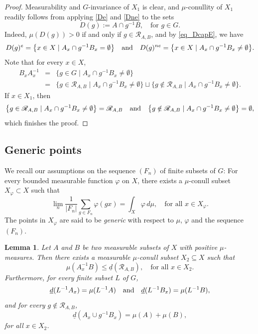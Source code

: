 \documentclass[10pt]{amsart}
\let\mathcal\mathscr
\newcommand{\cR}{\mathcal{R}}
\newcommand{\qand}{\quad\textup{and}\quad}
\theoremstyle{plain}
\newtheorem{lemma}[theorem]{Lemma}
\theoremstyle{definition}
\begin{document}
\begin{proof}
Measurability and $G$-invariance of $X_1$ is clear, and $\mu$-conullity of $X_1$ readily follows from applying \eqref{De} and \eqref{Dne} to the sets
\[
D(g) := A \cap g^{-1}B, \quad \textrm{for $g \in G$}.
\]
Indeed, $\mu(D(g)) > 0$ if and only if $g \in \cR_{A,B}$, and by \eqref{eq_DcapE}, we have
\[
D(g)^{e} = \bigl\{ x \in X \mid  A_x \cap g^{-1} B_x = \emptyset \bigr\}
\qand
D(g)^{ne} = \bigl\{ x \in X \mid  A_x \cap g^{-1}B_x \neq \emptyset \bigr\}.
\]
Note that for every $x \in X$,
\begin{eqnarray*}
B_x A^{-1}_x
&=&
\bigl\{ g \in G \mid  A_x \cap g^{-1} B_x \neq \emptyset \bigr\} \\[2pt]
&=&
\bigl\{ g \in \cR_{A,B} \mid  A_x \cap g^{-1} B_x \neq \emptyset \bigr\} \sqcup \bigl\{ g \notin \cR_{A,B} \mid  A_x \cap g^{-1} B_x \neq \emptyset \bigr\}.
\end{eqnarray*}
If $x \in X_1$, then
\[
\bigl\{ g \in \cR_{A,B} \mid  A_x \cap g^{-1} B_x \neq \emptyset \bigr\} = \cR_{A,B}
\qand
\bigl\{ g \notin \cR_{A,B} \mid  A_x \cap g^{-1} B_x \neq \emptyset \bigr\} = \emptyset,
\]
which finishes the proof.
\end{proof}

\subsection{Generic points}

We recall our assumptions on the sequence $(F_n)$ of finite subsets of $G$: For every bounded measurable function $\varphi$ on $X$,
there exists a $\mu$-conull subset $X_\varphi \subset X$ such that
\[
\lim_n \frac{1}{|F_n|} \sum_{g \in F_n} \varphi(gx) = \int_X \varphi \, d\mu, \quad \textrm{for all $x \in X_\varphi$}.
\]
The points in $X_\varphi$ are said to be \emph{generic} with respect to $\mu$, $\varphi$ and the sequence $(F_n)$.
\begin{lemma}
\label{lemma_generic}
Let $A$ and $B$ be two measurable subsets of $X$ with positive $\mu$-measures. Then there exists a measurable $\mu$-conull subset $X_2 \subseteq X$
such that
\[
\mu(A_x^{-1}B) \leq \underline{d}(\cR_{A,B}), \quad \textrm{for all $x \in X_2$}.
\]
Furthermore, for every finite subset $L$ of $G$,
\[
\underline{d}(L^{-1}A_x) = \mu(L^{-1}A) \qand \underline{d}(L^{-1}B_x) = \mu(L^{-1}B),
\]
and for every $g \notin \cR_{A,B}$,
\[
\underline{d}(A_x \cup g^{-1}B_x) = \mu(A) + \mu(B),
\]
for all $x \in X_2$.
\end{lemma}
\end{document}
